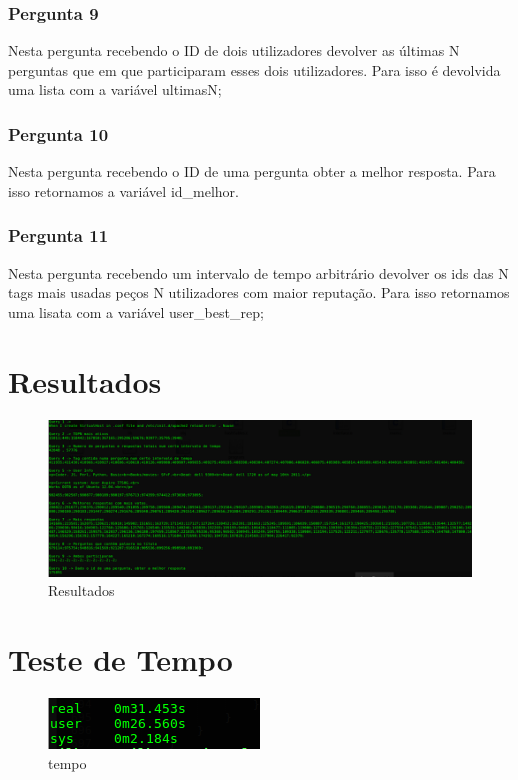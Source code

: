 \documentclass[a4paper]{article}
\begin{document}
		\subsubsection{Pergunta 9}
		Nesta pergunta recebendo o ID de dois utilizadores devolver as últimas N perguntas que em que participaram esses dois utilizadores.
		Para isso é devolvida uma lista com a variável ultimasN;
		\subsubsection{Pergunta 10}
		Nesta pergunta recebendo o ID de uma pergunta obter a melhor resposta. Para isso retornamos a variável id_melhor.
		\subsubsection{Pergunta 11}
		Nesta pergunta recebendo um intervalo de tempo arbitrário devolver os ids das N tags mais usadas peços N utilizadores com maior reputação. Para isso retornamos uma lisata com a variável user_best_rep;

		
\section {Resultados}

\begin{figure}[ht]
	\centering
	\includegraphics[scale =0.50]{resultados.png}
	\caption{Resultados}
	\label{img:Resultados}
	\end{figure}

\section {Teste de Tempo}

\begin{figure}[ht]
	\centering
	\includegraphics[scale =0.50]{tempo.png}
	\caption{tempo}
	\label{img:tempo}
	\end{figure}
\end{document}
